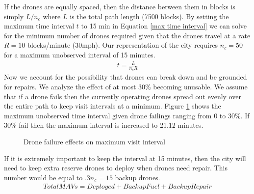 \documentclass{article}
\begin{document}
\newline If the drones are equally spaced, then the distance between them in blocks is simply $L/n_{c}$ where $L$ is the total path length (7500 blocks). By setting the maximum time interval $t$ to 15 min in Equation \ref{max time interval} we can solve for the minimum number of drones required given that the drones travel at a rate $R = 10$ blocks/minute (30mph). Our representation of the city requires $n_{c} = 50$ for a maximum unobserved interval of 15 minutes.
\begin{eqnarray}
t = \frac{L}{n_{c}R} \label{max time interval}
\end{eqnarray}
\newline Now we account for the possibility that drones can break down and be grounded for repairs. We analyze the effect of at most 30\% becoming unusable. We assume that if a drone fails then the currently operating drones spread out evenly over the entire path to keep visit intervals at a minimum. Figure \ref{failed} shows the maximum unobserved time interval given drone failings ranging from 0 to 30\%. If 30\% fail then the maximum interval is increased to 21.12 minutes.
\begin{figure}[htb!]
    \caption{Drone failure effects on maximum visit interval}
   \label{failed}
\end{figure}
If it is extremely important to keep the interval at 15 minutes, then the city will need to keep extra reserve drones to deploy when drones need repair. This number would be equal to $.3n_{c} = 15$ backup drones.
\begin{eqnarray}
Total MAVs = Deployed + Backup Fuel + Backup Repair \label{totaldrones}
\end{eqnarray}
\end{document}
